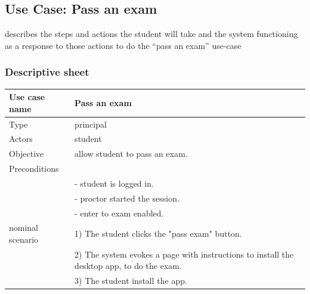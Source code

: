 \documentclass[]{uc2pfecaneva}
\begin{document}
    \begin{table}[h]
        \raggedright\subsection{Use Case: Pass an exam}
        describes the steps and actions the student will take and the system functioning as a response
        to those actions to do the “pass an exam” use-case
        \subsubsection{Descriptive sheet}
        \centering
        \begin{tabularx}{\textwidth}{|l|X|}
            \hline
            Use case name         & Pass an exam                                                                           \\ \hline
            Type                  & principal                                                                                         \\ \hline
            Actors                & student                                                                                           \\ \hline
            Objective             & allow student to pass an exam.                                                                    \\ \hline
            Preconditions         &                                                                                                   \\
            & - student is logged in.                                                                           \\
            & - proctor started the session.                                                                    \\
            & - enter to exam enabled.                                                                          \\ \hline
            nominal scenario
            & 1) The student clicks the "pass exam" button.                                                     \\
            & 2) The system evokes a page with instructions to install the desktop app, to do the exam.         \\
            & 3) The student install the app.                                                                   \\

\end{tabularx}
\end{table}
\end{document}
